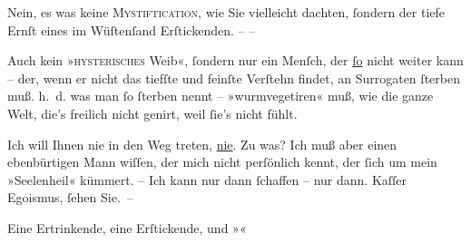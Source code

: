 \pstart
           Nein, es was keine \textsc{Mystiftication}, wie Sie vielleicht
               dachten,{ }ſondern der tiefe Ernſt eines im Wüſtenſand Erſtickenden. – –\pend
           
\pstart
           Auch kein »\textsc{hysterisches} Weib«,{ }ſondern nur ein Menſch, der
                  \uline{ſo} nicht weiter kann – der, wenn er nicht das
               tiefſte und feinſte Verſtehn findet, an Surrogaten{ }ſterben muß. h. d. was man{ }ſo{ }ſterben nennt – »wurmvegetiren« {\pb}muß, wie die
               ganze Welt, die’s freilich nicht genirt, weil{ }ſie’s nicht fühlt.\pend
           
\pstart
           Ich will Ihnen nie in den Weg treten, \uline{nie}. Zu was?
               Ich muß aber einen ebenbürtigen Mann wiſſen, der mich nicht perſönlich kennt, der{ }ſich um mein »Seelenheil« kümmert. – Ich kann nur dann{ }ſchaffen – nur dann. Kaſſer
               Egoismus,{ }ſehen Sie. –\pend
           
\pstart
           Eine Ertrinkende, eine Erſtickende, und »\label{K_L04552-2v}\label{K_L04552-2}«\pend
           
